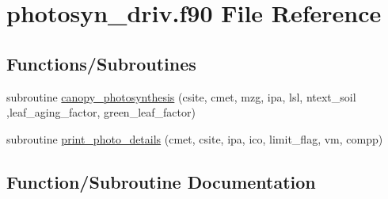 \hypertarget{photosyn__driv_8f90}{}\section{photosyn\+\_\+driv.\+f90 File Reference}
\label{photosyn__driv_8f90}
\subsection*{Functions/\+Subroutines}
\begin{DoxyCompactItemize}
\item 
subroutine \hyperlink{photosyn__driv_8f90_a47b3eb47a3b63c8b9a400606fd46a86b}{canopy\+\_\+photosynthesis} (csite, cmet, mzg, ipa, lsl, ntext\+\_\+soil                                                                                                                                                                                                                           ,leaf\+\_\+aging\+\_\+factor, green\+\_\+leaf\+\_\+factor)
\item 
subroutine \hyperlink{photosyn__driv_8f90_a8775d33a4716e83ecc08bf70b4d17f15}{print\+\_\+photo\+\_\+details} (cmet, csite, ipa, ico, limit\+\_\+flag, vm, compp)
\end{DoxyCompactItemize}


\subsection{Function/\+Subroutine Documentation}
